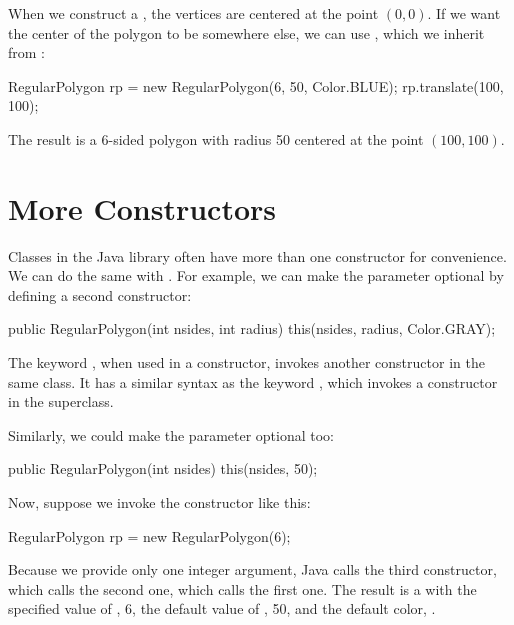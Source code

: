 When we construct a , the vertices are centered at the point $(0, 0)$.
If we want the center of the polygon to be somewhere else, we can use , which we inherit from :

\begin{code}
RegularPolygon rp = new RegularPolygon(6, 50, Color.BLUE);
rp.translate(100, 100);
\end{code}

The result is a 6-sided polygon with radius 50 centered at the point $(100, 100)$.



\section{More Constructors}

Classes in the Java library often have more than one constructor for convenience.
We can do the same with .
For example, we can make the  parameter optional by defining a second constructor:

\begin{code}
public RegularPolygon(int nsides, int radius) {
    this(nsides, radius, Color.GRAY);
}
\end{code}

The keyword , when used in a constructor, invokes another constructor in the same class.
It has a similar syntax as the keyword , which invokes a constructor in the superclass.

Similarly, we could make the  parameter optional too:

\begin{code}
public RegularPolygon(int nsides) {
    this(nsides, 50);
}
\end{code}

Now, suppose we invoke the  constructor like this:

\begin{code}
RegularPolygon rp = new RegularPolygon(6);
\end{code}

Because we provide only one integer argument, Java calls the third constructor, which calls the second one, which calls the first one.
The result is a  with the specified value of , 6, the default value of , 50, and the default color, .

